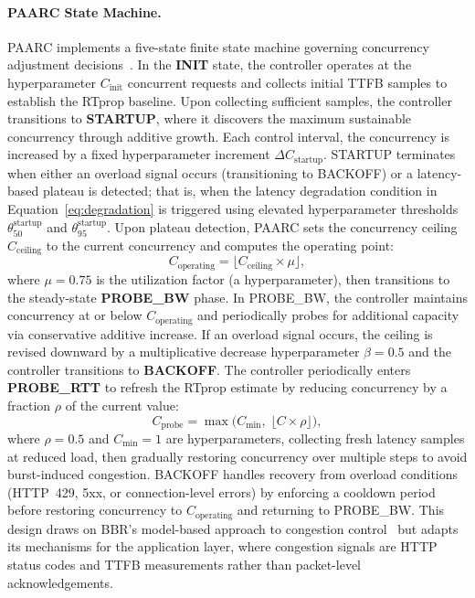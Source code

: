 \documentclass[11pt, letterpaper]{article}
\begin{document}
\paragraph{PAARC State Machine.}
PAARC implements a five-state finite state machine governing concurrency
adjustment decisions~\cite{deng2025flowdc}. In the \textbf{INIT} state, the
controller operates at the hyperparameter $C_{\mathrm{init}}$ concurrent requests and collects
initial TTFB samples to establish the RTprop baseline. Upon collecting
sufficient samples, the controller transitions to \textbf{STARTUP}, where it
discovers the maximum sustainable concurrency through additive growth. Each
control interval, the concurrency is increased by a fixed hyperparameter increment $\Delta C_{\mathrm{startup}}$. STARTUP
terminates when either an overload signal occurs (transitioning to BACKOFF) or a
latency-based plateau is detected; that is, when the latency degradation
condition in Equation~\ref{eq:degradation} is triggered using elevated
hyperparameter thresholds $\theta_{50}^{\mathrm{startup}}$ and
$\theta_{95}^{\mathrm{startup}}$. Upon plateau detection, PAARC sets the
concurrency ceiling $C_{\mathrm{ceiling}}$ to the current concurrency and
computes the operating point:
%
\begin{equation}
\label{eq:operating}
C_{\mathrm{operating}} = \lfloor C_{\mathrm{ceiling}} \times \mu \rfloor,
\end{equation}
%
where $\mu = 0.75$ is the utilization factor (a hyperparameter), then transitions to the
steady-state \textbf{PROBE\_BW} phase. In PROBE\_BW, the controller maintains
concurrency at or below $C_{\mathrm{operating}}$ and periodically probes for
additional capacity via conservative additive increase. If an overload signal
occurs, the ceiling is revised downward by a multiplicative decrease hyperparameter
$\beta = 0.5$ and the controller transitions to \textbf{BACKOFF}. The
controller periodically enters \textbf{PROBE\_RTT} to refresh the RTprop
estimate by reducing concurrency by a fraction $\rho$ of the current value:
%
\begin{equation}
\label{eq:probe_rtt}
C_{\mathrm{probe}} = \max\bigl(C_{\mathrm{min}},\;
  \lfloor C \times \rho \rfloor\bigr),
\end{equation}
%
where $\rho = 0.5$ and $C_{\mathrm{min}} = 1$ are hyperparameters,
collecting fresh latency samples at reduced load, then gradually restoring
concurrency over multiple steps to avoid burst-induced congestion. BACKOFF
handles recovery from overload conditions (HTTP~429, 5xx, or connection-level
errors) by enforcing a cooldown period before restoring concurrency to
$C_{\mathrm{operating}}$ and returning to PROBE\_BW. This design draws on
BBR's model-based approach to congestion
control~\cite{cardwell2017bbr} but adapts its mechanisms for the application
layer, where congestion signals are HTTP status codes and TTFB measurements
rather than packet-level acknowledgements.
\end{document}
